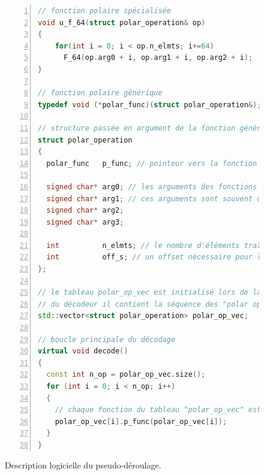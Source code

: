 \begin{figure}[ht]
\begin{lstlisting}[language=C++, numbers=left, numbersep=0.3em, tabsize=2, basicstyle=\footnotesize\ttfamily]
// fonction polaire spécialisée
void u_f_64(struct polar_operation& op)
{
    for(int i = 0; i < op.n_elmts; i+=64)
      F_64(op.arg0 + i, op.arg1 + i, op.arg2 + i);
}

// fonction polaire générique
typedef void (*polar_func)(struct polar_operation&);

// structure passée en argument de la fonction générique
struct polar_operation
{
  polar_func   p_func; // pointeur vers la fonction polaire spécialisée 

  signed char* arg0; // les arguments des fonctions polaires spécialisées
  signed char* arg1; // ces arguments sont souvent des adresses
  signed char* arg2;
  signed char* arg3;

  int          n_elmts; // le nombre d'éléments traités en parallèle
  int          off_s; // un offset nécessaire pour l'accès aux PSs
};

// le tableau polar_op_vec est initialisé lors de la construction
// du décodeur il contient la séquence des "polar operation"
std::vector<struct polar_operation> polar_op_vec;

// boucle principale du décodage
virtual void decode()
{
  const int n_op = polar_op_vec.size();
  for (int i = 0; i < n_op; i++)
  {
    // chaque fonction du tableau "polar_op_vec" est appelée
    polar_op_vec[i].p_func(polar_op_vec[i]); 
  }
}
\end{lstlisting}
\caption{Description logicielle du pseudo-déroulage.}
\label{fig:tensilica_code}
\end{figure}
\clearpage








